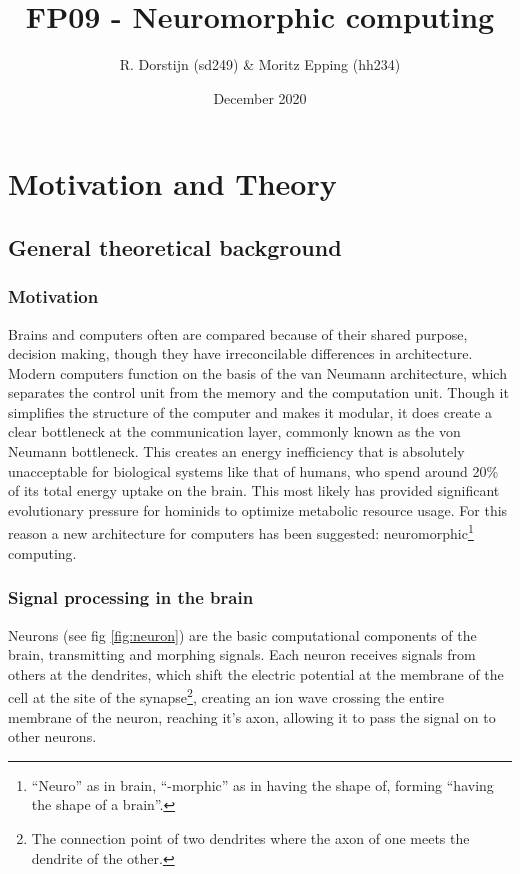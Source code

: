 \documentclass[a4paper,twocolumn]{article}
\title{FP09 - Neuromorphic computing}
\author{R. Dorstijn (sd249) \& Moritz Epping (hh234)}
\date{December 2020}
\begin{document}
\maketitle

\section{Motivation and Theory}
\subsection{General theoretical background}
\subsubsection{Motivation}
Brains and computers often are compared because of their shared purpose,
decision making, though they have irreconcilable differences in architecture.
Modern computers function on the basis of the van Neumann
architecture\cite{von-Neumann}, which separates the control unit from the memory
and the computation unit. Though it simplifies the structure of the computer and
makes it modular, it does create a clear bottleneck at the communication layer,
commonly known as the von Neumann bottleneck. This creates an energy
inefficiency that is absolutely unacceptable for biological systems like that of
humans, who spend around 20\% of its total energy uptake on the brain\cite{metabolic-rates}.
This most likely has provided significant evolutionary pressure for hominids to
optimize metabolic resource usage\cite{seymour2016fossil}. For this reason a new
architecture for computers has been suggested: neuromorphic\footnote{``Neuro''
as in brain, ``-morphic'' as in having the shape of, forming ``having the shape
of a brain''.} computing.

\subsubsection{Signal processing in the brain}
Neurons (see fig \ref{fig:neuron}) are the basic computational components of the
brain, transmitting and morphing signals. Each neuron receives signals from
others at the dendrites, which shift the electric potential at the membrane of
the cell at the site of the synapse\footnote{The connection point of two
dendrites where the axon of one meets the dendrite of the other.}, creating an
ion wave crossing the entire membrane of the neuron, reaching it's axon,
allowing it to pass the signal on to other neurons.
\end{document}
